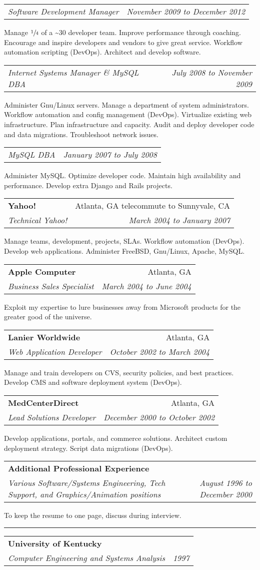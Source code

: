 \documentclass[10pt]{article}
\makeatletter
\newcounter{blocktitlechildren}
\newcommand{\blocktitle}[1]{
    \blocktitlechild{4mm}
    \setcounter{blocktitlechildren}{0}
    {{\sc{#1}\vspace{1.5mm}\hrule}\vspace*{1.5mm}}
}
\newcommand{\blocktitlechild}[2][]{
    \ifthenelse{\equal{\value{blocktitlechildren}}{0}}{}{\vspace{#2}#1}
    \addtocounter{blocktitlechildren}{1}
}
\newcommand{\sectionheader}[4]{
    \blocktitlechild{2mm}
    \begin{tabular*}{\textwidth}{l@{\extracolsep{\fill}}r}
    \textbf{#1} & #2\\
    \emph{#3} & \emph{#4}
    \end{tabular*}
}
\newcommand{\sectionsub}[2]{
    \blocktitlechild{1.4mm}
    \begin{tabular*}{\textwidth}{l@{\extracolsep{\fill}}r}
    \emph{#1} & \emph{#2}
    \end{tabular*}
}
\newenvironment{longtext}[1]{\small {#1}}
\makeatother
\begin{document}
\sectionsub
{Software Development Manager}
{November 2009 to December 2012}
\begin{longtext}
Manage $\sfrac{1}{4}$ of a \~{}30 developer team.
Improve performance through coaching.
Encourage and inspire developers and vendors to give great service.
Workflow automation scripting (DevOps).
Architect and develop software.
\end{longtext}
\sectionsub
{Internet Systems Manager \& MySQL DBA}
{July 2008 to November 2009}
\begin{longtext}
Administer Gnu/Linux servers.
Manage a department of system administrators.
Workflow automation and config management (DevOps).
Virtualize existing web infrastructure.
Plan infrastructure and capacity.
Audit and deploy developer code and data migrations.
Troubleshoot network issues.
\end{longtext}
\sectionsub
{MySQL DBA}
{January 2007 to July 2008}
\begin{longtext}
Administer MySQL.
Optimize developer code.
Maintain high availability and performance.
Develop extra Django and Rails projects.
\end{longtext}

\sectionheader
{Yahoo!}{Atlanta, GA telecommute to Sunnyvale, CA}
{Technical Yahoo!}
{March 2004 to January 2007}
\begin{longtext}
Manage teams, development, projects, SLAs.
Workflow automation (DevOps).
Develop web applications.
Administer FreeBSD, Gnu/Linux, Apache, MySQL.
\end{longtext}

\sectionheader
{Apple Computer}{Atlanta, GA}
{Business Sales Specialist}
{March 2004 to June 2004}
\begin{longtext}
Exploit my expertise to lure businesses away from Microsoft products for the greater good of the universe.
\end{longtext}

\sectionheader
{Lanier Worldwide}{Atlanta, GA}
{Web Application Developer}
{October 2002 to March 2004}
\begin{longtext}
Manage and train developers on CVS, security policies, and best practices.
Develop CMS and software deployment system (DevOps).
\end{longtext}

\sectionheader
{MedCenterDirect}{Atlanta, GA}
{Lead Solutions Developer}
{December 2000 to October 2002}
\begin{longtext}
Develop applications, portals, and commerce solutions.
Architect custom deployment strategy.
Script data migrations (DevOps).
\end{longtext}

\sectionheader
{Additional Professional Experience}{}
{Various Software/Systems Engineering, Tech Support, and Graphics/Animation positions}
{August 1996 to December 2000}
\begin{longtext}
To keep the resume to one page, discuss during interview.
\end{longtext}

\blocktitle{Education}
\sectionheader
{University of Kentucky}{}
{Computer Engineering and Systems Analysis}
{1997}
\end{document}
